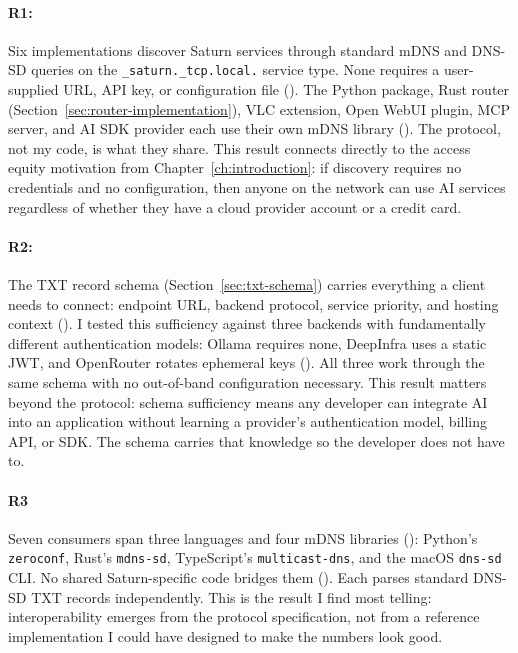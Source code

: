 \paragraph{R1:}
Six implementations discover Saturn services through standard mDNS and DNS-SD queries on the \texttt{\_saturn.\_tcp.local.} service type. None requires a user-supplied URL, API key, or configuration file (). The Python package, Rust router (Section~\ref{sec:router-implementation}), VLC extension, Open WebUI plugin, MCP server, and AI SDK provider each use their own mDNS library (). The protocol, not my code, is what they share. This result connects directly to the access equity motivation from Chapter~\ref{ch:introduction}: if discovery requires no credentials and no configuration, then anyone on the network can use AI services regardless of whether they have a cloud provider account or a credit card.

\paragraph{R2:}
The TXT record schema (Section~\ref{sec:txt-schema}) carries everything a client needs to connect: endpoint URL, backend protocol, service priority, and hosting context (). I tested this sufficiency against three backends with fundamentally different authentication models: Ollama requires none, DeepInfra uses a static JWT, and OpenRouter rotates ephemeral keys (). All three work through the same schema with no out-of-band configuration necessary. This result matters beyond the protocol: schema sufficiency means any developer can integrate AI into an application without learning a provider's authentication model, billing API, or SDK. The schema carries that knowledge so the developer does not have to.

\paragraph{R3}
Seven consumers span three languages and four mDNS libraries (): Python's \texttt{zeroconf}, Rust's \texttt{mdns-sd}, TypeScript's \texttt{multicast-dns}, and the macOS \texttt{dns-sd} CLI. No shared Saturn-specific code bridges them (). Each parses standard DNS-SD TXT records independently. This is the result I find most telling: interoperability emerges from the protocol specification, not from a reference implementation I could have designed to make the numbers look good.


